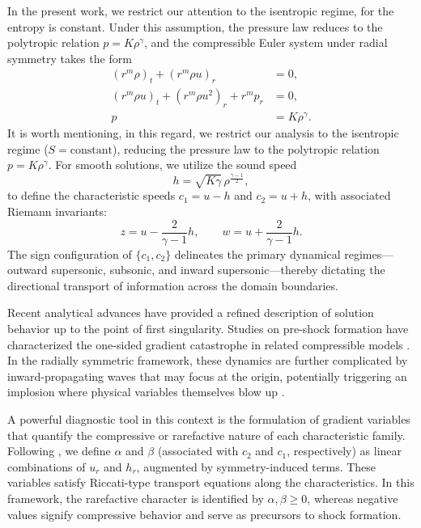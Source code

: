 \documentclass[11pt]{article}
\begin{document}
In the present work, we restrict our attention to the isentropic regime, for the entropy is constant. Under this assumption, the pressure law reduces to the polytropic relation \(p=K\rho^\gamma\), and the compressible Euler system under radial 
symmetry takes the form
\begin{align} 
  (r^m\rho)_t + (r^m\rho u)_r &= 0, \label{EulerSystem1} \\
  (r^m\rho u)_t + (r^m\rho u^2)_r + r^m p_r &= 0, \label{EulerSystem2}\\
  p &= K\rho^\gamma. \label{EulerSystem3}
\end{align}
It is worth mentioning, in this regard, we restrict our analysis to the isentropic regime ($S = \text{constant}$), reducing the pressure law to the polytropic relation $p = K\rho^\gamma$. 
For smooth solutions, we utilize the sound speed 
\begin{equation}
    h=\sqrt{K\gamma}\,\rho^{\frac{\gamma-1}{2}},
    \label{eq:h_function}
\end{equation}
to define the characteristic speeds $c_1 = u - h$ and $c_2 = u + h$, with associated Riemann invariants:
\begin{equation}\label{riemann_variables}
z = u - \frac{2}{\gamma-1}h, \qquad w = u + \frac{2}{\gamma-1}h.
\end{equation}
The sign configuration of $\{c_1, c_2\}$ delineates the primary dynamical regimes---{outward supersonic}, {subsonic}, and {inward supersonic}---thereby dictating the directional transport of information across the domain boundaries.

Recent analytical advances have provided a refined description of solution behavior up to the point of first singularity. Studies on pre-shock formation have characterized the one-sided gradient catastrophe in related compressible models \cite{Vicol0, Vicol1, Vicol2, Vicol3, Vicol4, Vicol5, Vicol6}. In the radially symmetric framework, these dynamics are further complicated by inward-propagating waves that may focus at the origin, potentially triggering an implosion where physical variables themselves blow up \cite{Vicol7}.

A powerful diagnostic tool in this context is the formulation of {gradient variables} that quantify the compressive or rarefactive nature of each characteristic family. Following \cite{F1}, we define $\alpha$ and $\beta$ (associated with $c_2$ and $c_1$, respectively) as linear combinations of $u_r$ and $h_r$, augmented by symmetry-induced terms. These variables satisfy Riccati-type transport equations along the characteristics. In this framework, the rarefactive character is identified by $\alpha, \beta \geq 0$, whereas negative values signify compressive behavior and serve as precursors to shock formation.
\end{document}
